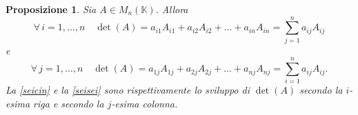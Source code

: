 \documentclass{article}
\theoremstyle{plain}
\newtheorem{prop}[thm]{Proposizione}
\theoremstyle{definition}
\theoremstyle{remark}
\begin{document}
\vspace{10pt}

\begin{bxthm}
\begin{prop}\label{propseinov}
    Sia $A\in M_n(\mathbb{K})$. Allora
    \begin{equation}
        \forall\,i=1,\ldots,n\quad \det(A)=a_{i1}A_{i1}+a_{i2}A_{i2}+\ldots+a_{in}A_{in} = \sum_{j=1}^{n}a_{ij}A_{ij} \label{seicin}
    \end{equation}
    e 
    \begin{equation}
        \forall\,j=1,\ldots,n\quad \det(A)=a_{1j}A_{1j}+a_{2j}A_{2j}+\ldots+a_{nj}A_{nj} = \sum_{i=1}^{n}a_{ij}A_{ij}.\label{seisei}
    \end{equation}
    La \ref{seicin} e la \ref{seisei} sono rispettivamente lo sviluppo di $\det(A)$ secondo la $i$-esima riga e secondo la $j$-esima colonna.
\end{prop}
\end{bxthm}
\end{document}
